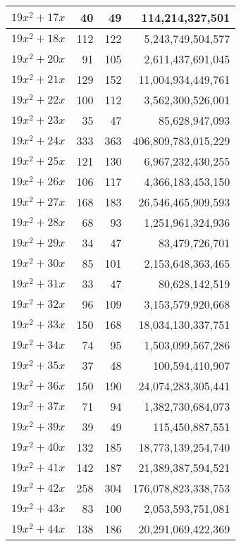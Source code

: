 \documentclass[a4paper]{amsproc}
\theoremstyle{plain}
\theoremstyle{named}
\begin{document}
\begin{longtable}{ | l | r | r | r | }
$19x^2 + 17x$ & 40 & 49 & 114{,}214{,}327{,}501 \\ \hline
$19x^2 + 18x$ & 112 & 122 & 5{,}243{,}749{,}504{,}577 \\ \hline
$19x^2 + 20x$ & 91 & 105 & 2{,}611{,}437{,}691{,}045 \\ \hline
$19x^2 + 21x$ & 129 & 152 & 11{,}004{,}934{,}449{,}761 \\ \hline
$19x^2 + 22x$ & 100 & 112 & 3{,}562{,}300{,}526{,}001 \\ \hline
$19x^2 + 23x$ & 35 & 47 & 85{,}628{,}947{,}093 \\ \hline
$19x^2 + 24x$ & 333 & 363 & 406{,}809{,}783{,}015{,}229 \\ \hline
$19x^2 + 25x$ & 121 & 130 & 6{,}967{,}232{,}430{,}255 \\ \hline
$19x^2 + 26x$ & 106 & 117 & 4{,}366{,}183{,}453{,}150 \\ \hline
$19x^2 + 27x$ & 168 & 183 & 26{,}546{,}465{,}909{,}593 \\ \hline
$19x^2 + 28x$ & 68 & 93 & 1{,}251{,}961{,}324{,}936 \\ \hline
$19x^2 + 29x$ & 34 & 47 & 83{,}479{,}726{,}701 \\ \hline
$19x^2 + 30x$ & 85 & 101 & 2{,}153{,}648{,}363{,}465 \\ \hline
$19x^2 + 31x$ & 33 & 47 & 80{,}628{,}142{,}519 \\ \hline
$19x^2 + 32x$ & 96 & 109 & 3{,}153{,}579{,}920{,}668 \\ \hline
$19x^2 + 33x$ & 150 & 168 & 18{,}034{,}130{,}337{,}751 \\ \hline
$19x^2 + 34x$ & 74 & 95 & 1{,}503{,}099{,}567{,}286 \\ \hline
$19x^2 + 35x$ & 37 & 48 & 100{,}594{,}410{,}907 \\ \hline
$19x^2 + 36x$ & 150 & 190 & 24{,}074{,}283{,}305{,}441 \\ \hline
$19x^2 + 37x$ & 71 & 94 & 1{,}382{,}730{,}684{,}073 \\ \hline
$19x^2 + 39x$ & 39 & 49 & 115{,}450{,}887{,}551 \\ \hline
$19x^2 + 40x$ & 132 & 185 & 18{,}773{,}139{,}254{,}740 \\ \hline
$19x^2 + 41x$ & 142 & 187 & 21{,}389{,}387{,}594{,}521 \\ \hline
$19x^2 + 42x$ & 258 & 304 & 176{,}078{,}823{,}338{,}753 \\ \hline
$19x^2 + 43x$ & 83 & 100 & 2{,}053{,}593{,}751{,}081 \\ \hline
$19x^2 + 44x$ & 138 & 186 & 20{,}291{,}069{,}422{,}369 \\ \hline

\end{longtable}
\end{document}
